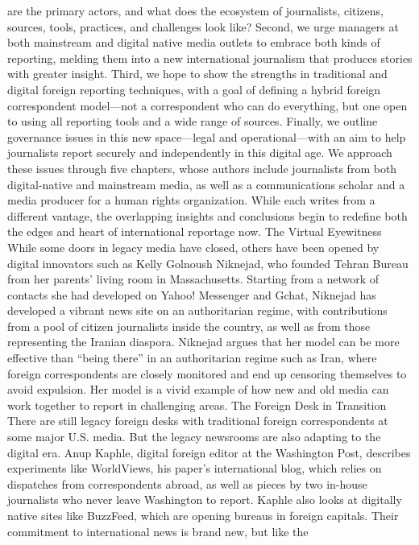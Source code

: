 are the primary actors, and what does the ecosystem of journalists, citizens, sources,
tools, practices, and challenges look like? Second, we urge managers at both mainstream
and digital native media outlets to embrace both kinds of reporting, melding them into a
new international journalism that produces stories with greater insight. Third, we hope to
show the strengths in traditional and digital foreign reporting techniques, with a goal of
defining a hybrid foreign correspondent model—not a correspondent who can do
everything, but one open to using all reporting tools and a wide range of sources. Finally,
we outline governance issues in this new space—legal and operational—with an aim to
help journalists report securely and independently in this digital age.
We approach these issues through five chapters, whose authors include journalists from
both digital-native and mainstream media, as well as a communications scholar and a
media producer for a human rights organization. While each writes from a different
vantage, the overlapping insights and conclusions begin to redefine both the edges and
heart of international reportage now.
The Virtual Eyewitness
While some doors in legacy media have closed, others have been opened by digital
innovators such as Kelly Golnoush Niknejad, who founded Tehran Bureau from her
parents’ living room in Massachusetts. Starting from a network of contacts she had
developed on Yahoo! Messenger and Gchat, Niknejad has developed a vibrant news site
on an authoritarian regime, with contributions from a pool of citizen journalists inside the
country, as well as from those representing the Iranian diaspora.
Niknejad argues that her model can be more effective than ``being there'' in an
authoritarian regime such as Iran, where foreign correspondents are closely monitored
and end up censoring themselves to avoid expulsion. Her model is a vivid example of
how new and old media can work together to report in challenging areas.
The Foreign Desk in Transition
There are still legacy foreign desks with traditional foreign correspondents at some major
U.S. media. But the legacy newsrooms are also adapting to the digital era. Anup Kaphle,
digital foreign editor at the Washington Post, describes experiments like WorldViews, his
paper’s international blog, which relies on dispatches from correspondents abroad, as
well as pieces by two in-house journalists who never leave Washington to report.
Kaphle also looks at digitally native sites like BuzzFeed, which are opening bureaus in
foreign capitals. Their commitment to international news is brand new, but like the
